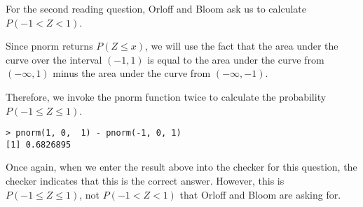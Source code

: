 \documentclass[a4paper,11pt]{article}
\begin{document}
For the second reading question, Orloff and Bloom ask us to calculate
$P \left( -1 < Z < 1 \right)$.

Since pnorm returns $P \left( Z \leq x \right)$, we will use the fact that the
area under the curve over the interval $ \left( -1, 1 \right)$ is equal
to the area under the curve from $\left(-\infty, 1 \right)$ minus the area
under the curve from $\left( -\infty, -1 \right)$.

Therefore, we invoke the pnorm function twice to calculate the probability
$P \left( -1 \leq Z \leq 1 \right)$.

\begin{lstlisting}
> pnorm(1, 0,  1) - pnorm(-1, 0, 1)
[1] 0.6826895
\end{lstlisting}

Once again, when we enter the result above into the checker for this question,
the checker indicates that this is the correct answer.  However, this is
$P \left( -1 \leq Z \leq 1 \right)$, not
$P \left( -1 < Z < 1 \right)$ that Orloff and Bloom are asking for.
\printbibliography{}
\end{document}
